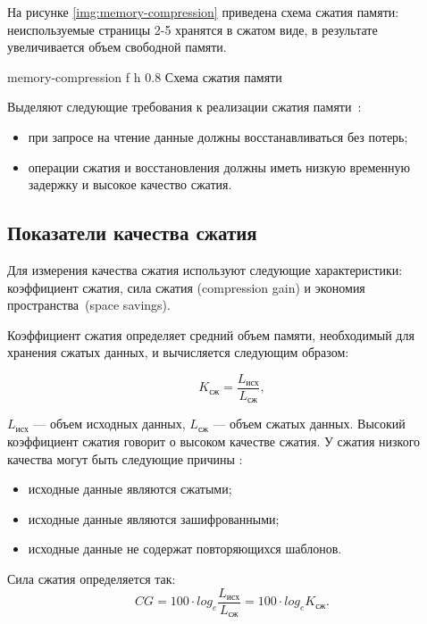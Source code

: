На рисунке \ref{img:memory-compression} приведена схема сжатия памяти: неиспользуемые страницы 2-5 хранятся в сжатом виде, в результате увеличивается объем свободной памяти.

    {memory-compression}
    {f}
    {h}
    {0.8\textwidth}
    {Схема сжатия памяти}

Выделяют следующие требования к реализации сжатия памяти~\cite{compression-requirements}:

\begin{itemize}
	\item при запросе на чтение данные должны восстанавливаться без потерь;
	\item операции сжатия и восстановления должны иметь низкую временную задержку и высокое качество сжатия.
\end{itemize}

\subsection{Показатели качества сжатия}

Для измерения качества сжатия используют следующие характеристики: коэффициент сжатия, сила сжатия (compression gain) и экономия пространства~(space savings).

Коэффициент сжатия определяет средний объем памяти, необходимый для хранения сжатых данных, и вычисляется следующим образом:

\begin{equation}\label{compression-coefficient}
	K_{\text{сж}} = \frac{L_{\text{исх}}}{L_{\text{сж}}},
\end{equation}

 $L_{\text{исх}}$ --- объем исходных данных, $L_{\text{сж}}$ --- объем сжатых данных. Высокий коэффициент сжатия говорит о высоком качестве сжатия. У сжатия низкого качества могут быть следующие причины \cite{bad-compression}:

\begin{itemize}
    \item исходные данные являются сжатыми;
    \item исходные данные являются зашифрованными;
    \item исходные данные не содержат повторяющихся шаблонов.
\end{itemize}

Сила сжатия определяется так:
\begin{equation}
	CG = 100 \cdot log_e \frac{L_{\text{исх}}}{L_{\text{сж}}} = 100 \cdot log_e K_{\text{сж}}.
\end{equation}

